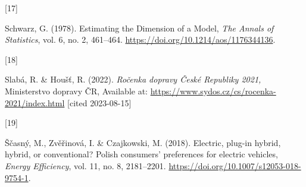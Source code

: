 \documentclass{mmeproc}
\newlength{\cslhangindent}
\newlength{\csllabelwidth}
\newenvironment{CSLReferences}[2] %
 {%
  \setlength{\parindent}{0pt}
  \ifodd #1
  \fi
  \setlength{\parskip}{-2pt}
 }%
 {}
\newcommand{\CSLLeftMargin}[1]{\parbox[t]{\csllabelwidth}{#1}}
\newcommand{\CSLRightInline}[1]{\parbox[t]{\linewidth - \csllabelwidth}{#1}\break}
\begin{document}
\begin{CSLReferences}{0}{0}
\leavevmode{}%
\CSLLeftMargin{{[}17{]} }%
\CSLRightInline{Schwarz, G. (1978). {Estimating the {Dimension} of a
{Model},} \emph{The Annals of Statistics}, vol. 6, no. 2, 461--464.
\url{https://doi.org/10.1214/aos/1176344136}.}

\leavevmode{}%
\CSLLeftMargin{{[}18{]} }%
\CSLRightInline{Slabá, R. \& Houšť, R. (2022). \emph{Ročenka dopravy {České
Republiky} 2021,} {Ministerstvo dopravy ČR}, Available at:
\url{https://www.sydos.cz/cs/rocenka-2021/index.html} {{[}cited 2023-08-15{]}}}

\leavevmode{}%
\CSLLeftMargin{{[}19{]} }%
\CSLRightInline{Ščasný, M., Zvěřinová, I. \& Czajkowski, M. (2018). {Electric,
plug-in hybrid, hybrid, or conventional? {Polish} consumers' preferences
for electric vehicles,} \emph{Energy Efficiency}, vol. 11, no. 8, 2181--2201.
\url{https://doi.org/10.1007/s12053-018-9754-1}.}

\end{CSLReferences}
\end{document}
